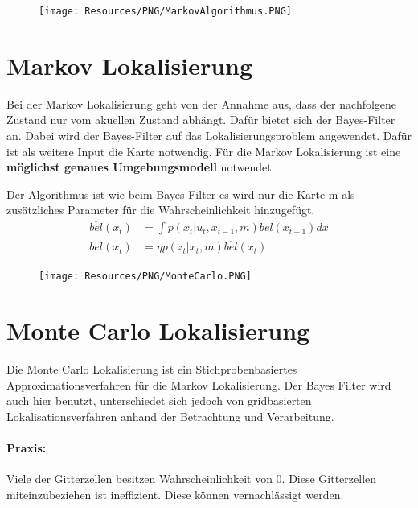 {
\begin{figure}
	\texttt{[image: Resources/PNG/MarkovAlgorithmus.PNG]}
\end{figure}
\section{Markov Lokalisierung}
Bei der Markov Lokalisierung geht von der Annahme aus, dass der nachfolgene
Zustand nur vom akuellen Zustand abhängt. Dafür bietet sich der Bayes-Filter an.
Dabei wird der Bayes-Filter auf das Lokalisierungsproblem angewendet. Dafür ist
als weitere Input die Karte notwendig. Für die Markov Lokalisierung ist eine
\textbf{möglichst genaues Umgebungsmodell} notwendet.

Der Algorithmus ist wie beim Bayes-Filter es wird nur die Karte m als
zusätzliches Parameter für die Wahrscheinlichkeit hinzugefügt.
\begin{align*}
	\overline{bel}(x_t) &= \int p(x_t | u_t, x_{t-1}, m)bel(x_{t-1})dx \\
	bel(x_t) &= \eta p(z_t | x_t, m)\overline{bel}(x_t)
\end{align*}

}

{
\begin{figure}
	\texttt{[image: Resources/PNG/MonteCarlo.PNG]}
\end{figure}
\section{Monte Carlo Lokalisierung}
Die Monte Carlo Lokalisierung ist ein Stichprobenbasiertes
Approximationsverfahren für die Markov Lokalisierung. Der Bayes Filter wird
auch hier benutzt, unterschiedet sich jedoch von gridbasierten
Lokalisationsverfahren anhand der Betrachtung und Verarbeitung.

\paragraph{Praxis:} Viele der Gitterzellen besitzen Wahrscheinlichkeit von 0.
Diese Gitterzellen miteinzubeziehen ist ineffizient. Diese können vernachlässigt
werden.

}

